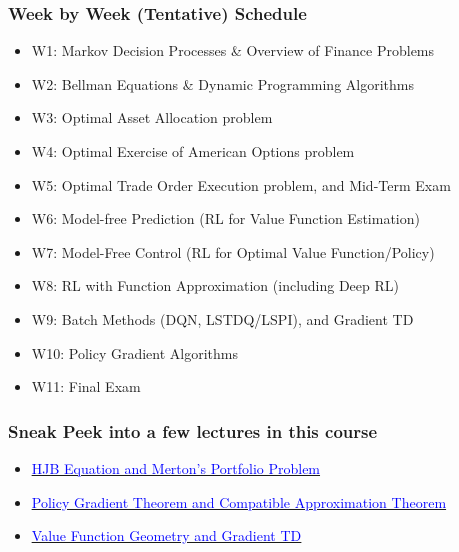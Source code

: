 \documentclass[handout]{beamer}
\begin{document}
\begin{frame}
\frametitle{Week by Week (Tentative) Schedule}
\pause
\begin{itemize}[<+->]
\item W1: Markov Decision Processes \& Overview of Finance Problems
\item W2: Bellman Equations \& Dynamic Programming Algorithms
\item W3: Optimal Asset Allocation problem
\item W4: Optimal Exercise of American Options problem
\item W5: Optimal Trade Order Execution problem, and Mid-Term Exam
\item W6: Model-free Prediction (RL for Value Function Estimation)
\item W7: Model-Free Control (RL for Optimal Value Function/Policy)
\item W8: RL with Function Approximation (including Deep RL)
\item W9: Batch Methods (DQN, LSTDQ/LSPI), and Gradient TD
\item W10: Policy Gradient Algorithms
\item W11: Final Exam
\end{itemize}
\end{frame}

\begin{frame}
\frametitle{Sneak Peek into a few lectures in this course}
\begin{itemize}
\item \href{https://github.com/coverdrive/technical-documents/blob/master/finance/cme241/MertonPortfolio.pdf}{\underline{\textcolor{blue}{HJB Equation and Merton's Portfolio Problem}}}
\item \href{https://github.com/coverdrive/technical-documents/blob/master/finance/cme241/PolicyGradient.pdf}{\underline{\textcolor{blue}{Policy Gradient Theorem and Compatible Approximation Theorem}}}
\item \href{https://github.com/coverdrive/technical-documents/blob/master/finance/cme241/ValueFunctionGeometry.pdf}{\underline{\textcolor{blue}{Value Function Geometry and Gradient TD}}}
\end{itemize}
\end{frame}
\end{document}
